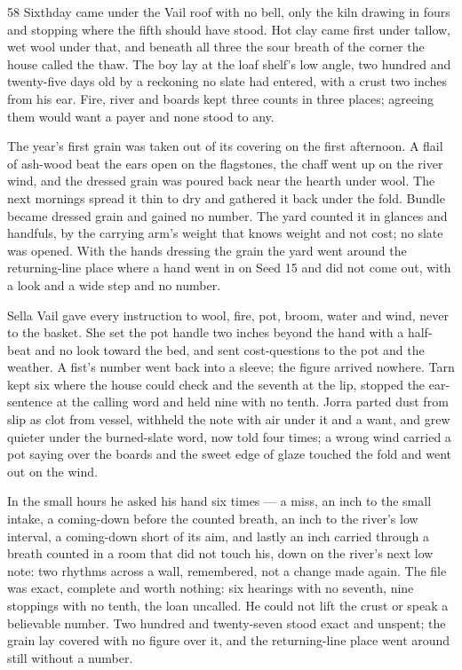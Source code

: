 \begin{CRchronicle}{58}
Sixthday came under the Vail roof with no bell, only the kiln drawing in fours and stopping where the fifth should have stood. Hot clay came first under tallow, wet wool under that, and beneath all three the sour breath of the corner the house called the thaw. The boy lay at the loaf shelf’s low angle, two hundred and twenty-five days old by a reckoning no slate had entered, with a crust two inches from his ear. Fire, river and boards kept three counts in three places; agreeing them would want a payer and none stood to any.

The year’s first grain was taken out of its covering on the first afternoon. A flail of ash-wood beat the ears open on the flagstones, the chaff went up on the river wind, and the dressed grain was poured back near the hearth under wool. The next mornings spread it thin to dry and gathered it back under the fold. Bundle became dressed grain and gained no number. The yard counted it in glances and handfuls, by the carrying arm’s weight that knows weight and not cost; no slate was opened. With the hands dressing the grain the yard went around the returning-line place where a hand went in on Seed 15 and did not come out, with a look and a wide step and no number.

Sella Vail gave every instruction to wool, fire, pot, broom, water and wind, never to the basket. She set the pot handle two inches beyond the hand with a half-beat and no look toward the bed, and sent cost-questions to the pot and the weather. A fist’s number went back into a sleeve; the figure arrived nowhere. Tarn kept six where the house could check and the seventh at the lip, stopped the ear-sentence at the calling word and held nine with no tenth. Jorra parted dust from slip as clot from vessel, withheld the note with air under it and a want, and grew quieter under the burned-slate word, now told four times; a wrong wind carried a pot saying over the boards and the sweet edge of glaze touched the fold and went out on the wind.

In the small hours he asked his hand six times --- a miss, an inch to the small intake, a coming-down before the counted breath, an inch to the river’s low interval, a coming-down short of its aim, and lastly an inch carried through a breath counted in a room that did not touch his, down on the river’s next low note: two rhythms across a wall, remembered, not a change made again. The file was exact, complete and worth nothing: six hearings with no seventh, nine stoppings with no tenth, the loan uncalled. He could not lift the crust or speak a believable number. Two hundred and twenty-seven stood exact and unspent; the grain lay covered with no figure over it, and the returning-line place went around still without a number.
\end{CRchronicle}
